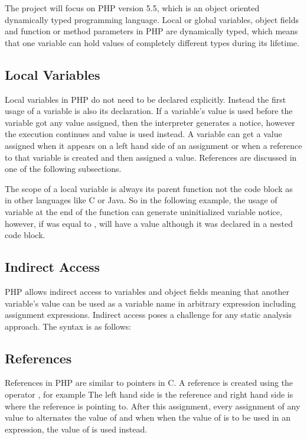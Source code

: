 The project will focus on PHP version 5.5, which is an object 
oriented dynamically typed programming language. Local or global 
variables, object fields and function or method parameters in PHP 
are dynamically typed, which means that one variable can hold 
values of completely different types during its lifetime.

\subsection{Local Variables}
Local variables in PHP do not need to be declared explicitly. 
Instead the first usage of a variable is also its declaration. 
If a variable's value is used before the variable got any 
value assigned, then the interpreter generates a notice, 
however the execution continues and value  is 
used instead. A variable can get a value assigned when it 
appears on a left hand side of an assignment or when a 
reference to that variable is created and then assigned a value. 
References are discussed in one of the following subsections.

The scope of a local variable is always its parent function not the 
code block as in other languages like C or Java. So in the following 
example, the usage of variable  at the end of the function 
can generate uninitialized variable notice, however, if  
was equal to ,  will have a value although it 
was declared in a nested code block.


\subsection{Indirect Access}
PHP allows indirect access to variables and object fields meaning 
that another variable's value can be used as a variable name in 
arbitrary expression including assignment expressions. 
Indirect access poses a challenge for any static analysis approach. 
The syntax is as follows:


\subsection{References}
References in PHP are similar to pointers in C. A reference is 
created using the operator \code{\&=}, 
for example  The left hand side is 
the reference and right hand side is where the reference 
is pointing to. After this assignment, every assignment of any 
value to  alternates the value of  and 
when when the value of  is to be used in an expression, 
the value of  is used instead.

